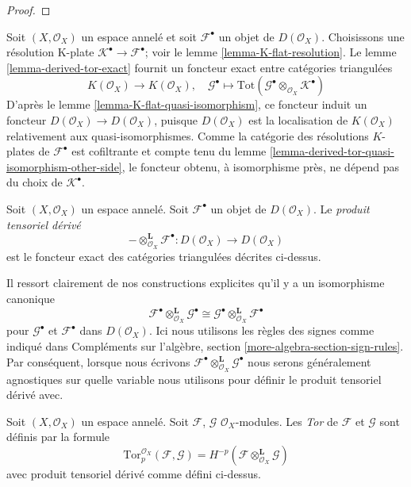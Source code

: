 {\begin{proof}
\end{proof}

\noindent
Soit $(X, \mathcal{O}_X)$ un espace annelé et soit $\mathcal{F}^\bullet$ un objet de $D(\mathcal{O}_X)$. Choisissons une résolution K-plate $\mathcal{K}^\bullet \to \mathcal{F}^\bullet$; voir le lemme \ref{lemma-K-flat-resolution}. Le lemme \ref{lemma-derived-tor-exact} fournit un foncteur exact entre catégories triangulées $$
K(\mathcal{O}_X)
\longrightarrow
K(\mathcal{O}_X),
\quad
\mathcal{G}^\bullet
\longmapsto
\text{Tot}(\mathcal{G}^\bullet \otimes_{\mathcal{O}_X} \mathcal{K}^\bullet)
$$ D'après le lemme \ref{lemma-K-flat-quasi-isomorphism}, ce foncteur induit un foncteur $D(\mathcal{O}_X) \to D(\mathcal{O}_X)$, puisque $D(\mathcal{O}_X)$ est la localisation de $K(\mathcal{O}_X)$ relativement aux quasi-isomorphismes. Comme la catégorie des résolutions $K$-plates de $\mathcal{F}^\bullet$ est cofiltrante et compte tenu du lemme \ref{lemma-derived-tor-quasi-isomorphism-other-side}, le foncteur obtenu, à isomorphisme près, ne dépend pas du choix de $\mathcal{K}^\bullet$.

\begin{definition}

\label{definition-derived-tor}
Soit $(X, \mathcal{O}_X)$ un espace annelé. Soit $\mathcal{F}^\bullet$ un objet de $D(\mathcal{O}_X)$. Le {\it produit tensoriel dérivé} $$
- \otimes_{\mathcal{O}_X}^{\mathbf{L}} \mathcal{F}^\bullet :
D(\mathcal{O}_X)
\longrightarrow
D(\mathcal{O}_X)
$$ est le foncteur exact des catégories triangulées décrites ci-dessus.
\end{definition}

\noindent
Il ressort clairement de nos constructions explicites qu'il y a un isomorphisme canonique $$
\mathcal{F}^\bullet \otimes_{\mathcal{O}_X}^{\mathbf{L}} \mathcal{G}^\bullet
\cong
\mathcal{G}^\bullet \otimes_{\mathcal{O}_X}^{\mathbf{L}} \mathcal{F}^\bullet
$$ pour $\mathcal{G}^\bullet$ et $\mathcal{F}^\bullet$ dans $D(\mathcal{O}_X)$. Ici nous utilisons les règles des signes comme indiqué dans Compléments sur l'algèbre, section \ref{more-algebra-section-sign-rules}. Par conséquent, lorsque nous écrivons $\mathcal{F}^\bullet \otimes_{\mathcal{O}_X}^{\mathbf{L}} \mathcal{G}^\bullet$ nous serons généralement agnostiques sur quelle variable nous utilisons pour définir le produit tensoriel dérivé avec.

\begin{definition}

\label{definition-tor}
Soit $(X, \mathcal{O}_X)$ un espace annelé. Soit $\mathcal{F}$, $\mathcal{G}$ $\mathcal{O}_X$-modules. Les {\it Tor} de $\mathcal{F}$ et $\mathcal{G}$ sont définis par la formule $$
\text{Tor}_p^{\mathcal{O}_X}(\mathcal{F}, \mathcal{G}) =
H^{-p}(\mathcal{F} \otimes_{\mathcal{O}_X}^\mathbf{L} \mathcal{G})
$$ avec produit tensoriel dérivé comme défini ci-dessus.
\end{definition}

}
